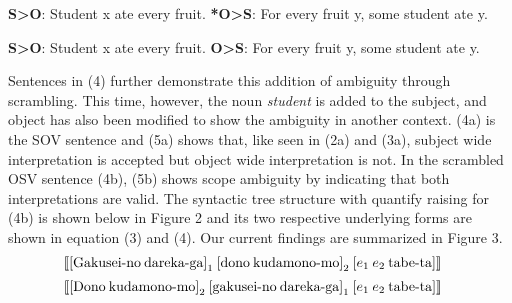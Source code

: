 \documentclass[english, 11pt]{article}
\begin{document}
\begin{exe}
	\ex 
	\begin{xlist}
		\label{1a}
		\label{1b}
	\end{xlist}
\end{exe}
\begin {exe}
	\ex 
		\begin {xlist}
			\ex 
				\begin {xlist}
					\ex \textbf{S>O}: Student x ate every fruit.\label{2ai}
					\ex \textbf{*O>S}: For every fruit y, some student ate y.\label{2aii}
				\end {xlist}
			\ex
				\begin {xlist} 
					\ex \textbf{S>O}: Student x ate every fruit.\label{2bi}
					\ex \textbf{O>S}: For every fruit y, some student ate y.\label{2bii}
				\end {xlist}
		\end {xlist}
\end {exe}
Sentences in (4) further demonstrate this addition of ambiguity through scrambling. This time, however, the noun \emph{student} is added to the subject, and object has also been modified to show the ambiguity in another context. (4a) is the SOV sentence and (5a) shows that, like seen in (2a) and (3a), subject wide interpretation is accepted but object wide interpretation is not. In the scrambled OSV sentence (4b), (5b) shows scope ambiguity by indicating that both interpretations are valid. The syntactic tree structure with quantify raising for (4b) is shown below in Figure 2 and its two respective underlying forms are shown in equation (3) and (4). Our current findings are summarized in Figure 3.
\begin{equation}
	\llbracket  \text{[Gakusei-no\:dareka-ga]}_{1}\:\text{[dono\:kudamono-mo]}_{2}\:[e_{1}\:e_{2}\:\text{tabe-ta}] \rrbracket \quad
\end{equation}
\begin{equation}
	\llbracket  \text{[Dono\:kudamono-mo]}_{2}\:\text{[gakusei-no\:dareka-ga]}_{1}\:[e_{1}\:e_{2}\:\text{tabe-ta}] \rrbracket \quad
\end{equation}
\end{document}
